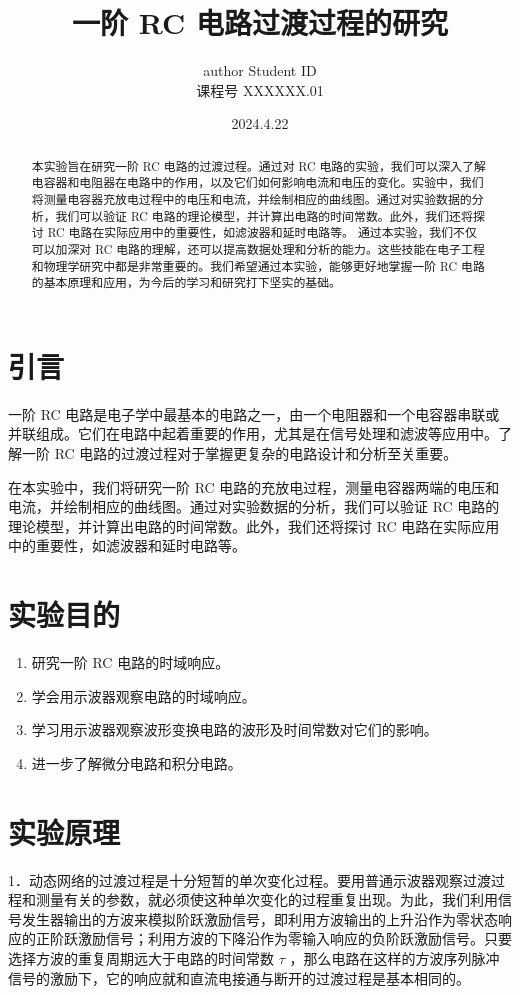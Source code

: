 \documentclass{article}
\title{\heiti\zihao{2} 一阶 RC 电路过渡过程的研究}
\author{\songti  author  Student ID  \\
课程号  XXXXXX.01 }
\date{2024.4.22}
\begin{document}
    \maketitle
    
\begin{abstract}
    本实验旨在研究一阶 RC 电路的过渡过程。通过对 RC 电路的实验，我们可以深入了解电容器和电阻器在电路中的作用，以及它们如何影响电流和电压的变化。实验中，我们将测量电容器充放电过程中的电压和电流，并绘制相应的曲线图。通过对实验数据的分析，我们可以验证 RC 电路的理论模型，并计算出电路的时间常数。此外，我们还将探讨 RC 电路在实际应用中的重要性，如滤波器和延时电路等。
    通过本实验，我们不仅可以加深对 RC 电路的理解，还可以提高数据处理和分析的能力。这些技能在电子工程和物理学研究中都是非常重要的。我们希望通过本实验，能够更好地掌握一阶 RC 电路的基本原理和应用，为今后的学习和研究打下坚实的基础。
    
\end{abstract}


\section{引言}
\label{sec:introduction}
    一阶 RC 电路是电子学中最基本的电路之一，由一个电阻器和一个电容器串联或并联组成。它们在电路中起着重要的作用，尤其是在信号处理和滤波等应用中。了解一阶 RC 电路的过渡过程对于掌握更复杂的电路设计和分析至关重要。
    
    在本实验中，我们将研究一阶 RC 电路的充放电过程，测量电容器两端的电压和电流，并绘制相应的曲线图。通过对实验数据的分析，我们可以验证 RC 电路的理论模型，并计算出电路的时间常数。此外，我们还将探讨 RC 电路在实际应用中的重要性，如滤波器和延时电路等。
    
\section{实验目的}
\begin{enumerate}
    \item 研究一阶 RC 电路的时域响应。
    \item 学会用示波器观察电路的时域响应。 
    \item 学习用示波器观察波形变换电路的波形及时间常数对它们的影响。
    \item 进一步了解微分电路和积分电路。 
\end{enumerate}

\section{实验原理}
1．动态网络的过渡过程是十分短暂的单次变化过程。要用普通示波器观察过渡过程和测量有关的参数，就必须使这种单次变化的过程重复出现。为此，我们利用信号发生器输出的方波来模拟阶跃激励信号，即利用方波输出的上升沿作为零状态响应的正阶跃激励信号；利用方波的下降沿作为零输入响应的负阶跃激励信号。只要选择方波的重复周期远大于电路的时间常数 $\tau$ ，那么电路在这样的方波序列脉冲信号的激励下，它的响应就和直流电接通与断开的过渡过程是基本相同的。
\end{document}
